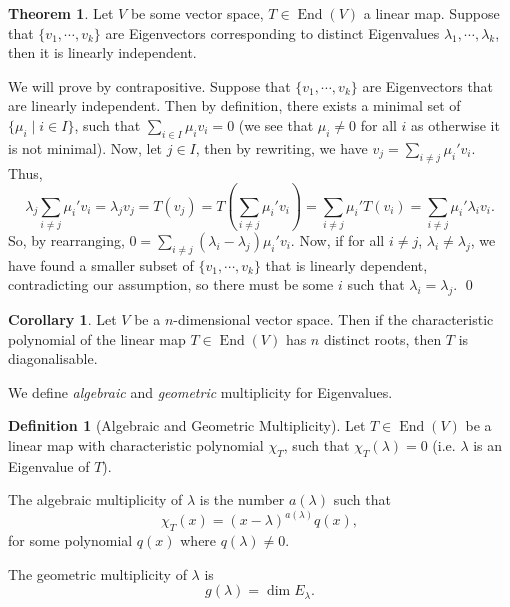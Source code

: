 \documentclass[
]{article}
\theoremstyle{definition}
\newtheorem{theorem}{Theorem}
\newtheorem{corollary}{Corollary}[theorem]
\theoremstyle{definition}
\newtheorem{definition}{Definition}[section]
\begin{document}
\begin{theorem}\label{eigen_li}
  Let \(V\) be some vector space, \(T \in \mathop{\mathrm{End}}(V)\) a linear map. Suppose that 
  \(\{v_1, \cdots, v_k\}\) are Eigenvectors corresponding to distinct 
  Eigenvalues \(\lambda_1, \cdots, \lambda_k\), then it is linearly independent.
\end{theorem}
\proof

We will prove by contrapositive. Suppose that \(\{v_1, \cdots, v_k\}\)
are Eigenvectors that are linearly independent. Then by definition,
there exists a minimal set of \(\{\mu_i \mid i \in I\}\), such that
\(\sum_{i \in I} \mu_i v_i = 0\) (we see that \(\mu_i \neq 0\) for all
\(i\) as otherwise it is not minimal). Now, let \(j \in I\), then by
rewriting, we have \(v_j = \sum_{i \neq j}\mu_i' v_i\). Thus, \[
    \lambda_j \sum_{i \neq j} \mu_i' v_i = \lambda_j v_j = T(v_j)
      = T\left(\sum_{i \neq j} \mu_i' v_i\right) 
      = \sum_{i \neq j} \mu_i' T(v_i) 
      = \sum_{i \neq j} \mu_i' \lambda_i v_i.
  \] So, by rearranging,
\(0 = \sum_{i \neq j}(\lambda_i - \lambda_j)\mu_i' v_i\). Now, if for
all \(i \neq j\), \(\lambda_i \neq \lambda_j\), we have found a smaller
subset of \(\{v_1, \cdots, v_k\}\) that is linearly dependent,
contradicting our assumption, so there must be some \(i\) such that
\(\lambda_i = \lambda_j\). \qed

\begin{corollary}
  Let \(V\) be a \(n\)-dimensional vector space. Then if the characteristic 
  polynomial of the linear map \(T \in \mathop{\mathrm{End}}(V)\) has \(n\) distinct roots, then 
  \(T\) is diagonalisable. 
\end{corollary}

We define \emph{algebraic} and \emph{geometric} multiplicity for
Eigenvalues.

\begin{definition}[Algebraic and Geometric Multiplicity]
  Let \(T \in \mathop{\mathrm{End}}(V)\) be a linear map with characteristic polynomial \(\chi_T\),
  such that \(\chi_T(\lambda) = 0\) (i.e. \(\lambda\) is an Eigenvalue of \(T\)).

  The algebraic multiplicity of \(\lambda\) is the number \(a(\lambda)\) such 
  that
  \[\chi_T(x) = (x - \lambda)^{a(\lambda)} q(x),\]
  for some polynomial \(q(x)\) where \(q(\lambda) \neq 0\).

  The geometric multiplicity of \(\lambda\) is
  \[g(\lambda) = \dim E_{\lambda}.\]
\end{definition}
\end{document}
